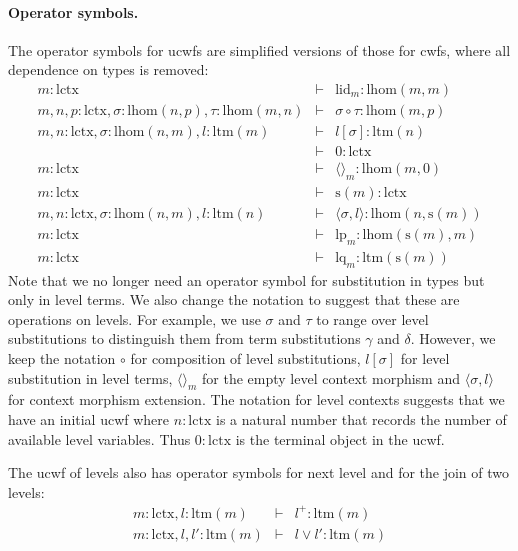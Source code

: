 \documentclass[11pt,a4paper]{article}
\theoremstyle{definition}
\def\lhom{\mathrm{lhom}}
\def\lctx{\mathrm{lctx}}
\def\ltm{\mathrm{ltm}}
\def\lp{\mathrm{lp}}
\def\lq{\mathrm{lq}}
\def\s{\mathrm{s}}
\def\lid{\mathrm{lid}}
\def\cp{\mathrm{cp}}
\def\cq{\mathrm{cq}}
\newcommand{\tuple}[1]{\langle #1 \rangle}
\begin{document}
\paragraph{Operator symbols.} The operator symbols for ucwfs are simplified versions of those for cwfs, where all dependence on types is removed:
\begin{eqnarray*}
m : \lctx &\vdash& \lid_m : \lhom(m,m)\\
m, n, p : \lctx, \sigma : \lhom(n,p), \tau : \lhom(m,n) &\vdash&
\sigma \circ \tau : \lhom(m,p)\\
m,n: \lctx, \sigma : \lhom(n,m), l :\ltm(m) &\vdash&  l[\sigma] : \ltm(n)\\
&\vdash& 0 : \lctx\\
m : \lctx &\vdash& \tuple{}_m : \lhom(m,0)\\
m : \lctx &\vdash& \s(m) : \lctx\\
m,n : \lctx, \sigma : \lhom(n,m), l:\ltm(n) &\vdash& \tuple{\sigma,l} : \lhom(n,\s(m))\\
m : \lctx &\vdash& \lp_m: \lhom(\s(m),m)\\
m : \lctx &\vdash& \lq_m: \ltm(\s(m))
\end{eqnarray*}
Note that we no longer need an operator symbol for substitution in types but only in level terms. We also change the notation to suggest that these are operations on levels. For example, we use $\sigma$ and $\tau$ to range over level substitutions to distinguish them from term substitutions $\gamma$ and $\delta$. However, we keep the notation $\circ$ for composition of level substitutions, $l[\sigma]$ for level substitution in level terms, $\tuple{}_m$ for the empty level context morphism and $\tuple{\sigma,l}$ for context morphism extension. The notation for level contexts suggests that we have an initial ucwf where $n : \lctx$ is a natural number that records the number of available level variables. Thus $0 : \lctx$ is the terminal object in the ucwf.

The ucwf of levels also has operator symbols for next level and for the join of two levels:
\begin{eqnarray*}
m : \lctx, l : \ltm(m) &\vdash& l^+ : \ltm(m)\\
m : \lctx, l,l' : \ltm(m) &\vdash& l \vee l' : \ltm(m)
\end{eqnarray*}
\end{document}
